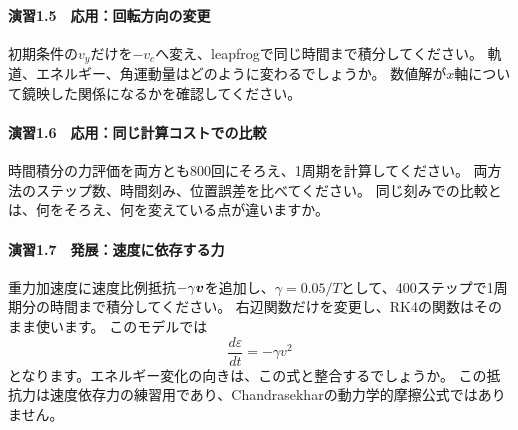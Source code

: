 \paragraph{演習1.5　応用：回転方向の変更}
初期条件の$v_y$だけを$-v_c$へ変え、leapfrogで同じ時間まで積分してください。
軌道、エネルギー、角運動量はどのように変わるでしょうか。
数値解が$x$軸について鏡映した関係になるかを確認してください。

\paragraph{演習1.6　応用：同じ計算コストでの比較}
時間積分の力評価を両方とも800回にそろえ、1周期を計算してください。
両方法のステップ数、時間刻み、位置誤差を比べてください。
同じ刻みでの比較とは、何をそろえ、何を変えている点が違いますか。

\paragraph{演習1.7　発展：速度に依存する力}
重力加速度に速度比例抵抗$-\gamma\boldsymbol v$を追加し、$\gamma=0.05/T$として、400ステップで1周期分の時間まで積分してください。
右辺関数だけを変更し、RK4の関数はそのまま使います。
このモデルでは
\begin{equation}
\frac{d\varepsilon}{dt}=-\gamma v^2
\label{eq:ch1-linear-drag-work}
\end{equation}
となります。エネルギー変化の向きは、この式と整合するでしょうか。
この抵抗力は速度依存力の練習用であり、Chandrasekharの動力学的摩擦公式ではありません。
